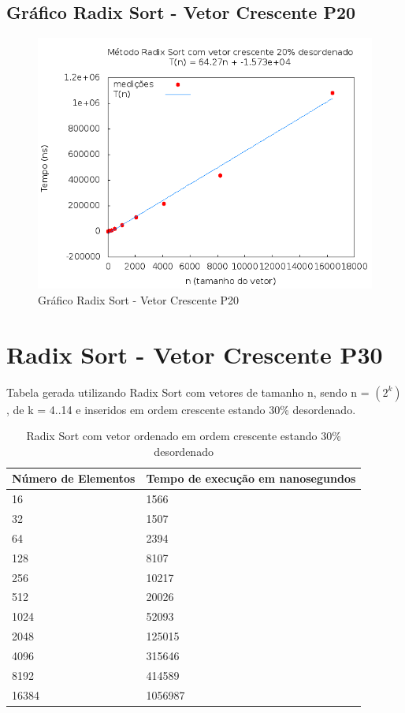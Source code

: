 \documentclass[12pt,a4paper,twoside]{report}
\begin{document}
\subsection{Gráfico Radix Sort - Vetor Crescente P20}
\begin{figure}[H]
    \centering
    \includegraphics[width=0.7\linewidth]{graficos/RadixSort/vIntCrescenteP20/vIntCrescenteP20.png}
  \caption{Gráfico Radix Sort - Vetor Crescente P20}
\end{figure}

\section{Radix Sort - Vetor Crescente P30}
Tabela gerada utilizando Radix Sort com vetores de tamanho n, sendo n = $(2^k)$, de k = 4..14 e inseridos em ordem crescente estando 30\% desordenado.
\begin{table}[H]
\centering
\caption{Radix Sort com vetor ordenado em ordem crescente estando 30\% desordenado}
\label{my-label}
\begin{tabular}{|l|l|}
\hline
\multicolumn{1}{|c|}{\textbf{Número de Elementos}} & \multicolumn{1}{c|}{\textbf{Tempo de execução em nanosegundos}} \\ \hline
16 & 1566 \\ \hline
32 & 1507 \\ \hline
64 & 2394 \\ \hline
128 & 8107 \\ \hline
256 & 10217 \\ \hline
512 & 20026 \\ \hline
1024 & 52093 \\ \hline
2048 & 125015 \\ \hline
4096 & 315646 \\ \hline
8192 & 414589 \\ \hline
16384 & 1056987 \\ \hline
\end{tabular}
\end{table}
\end{document}
